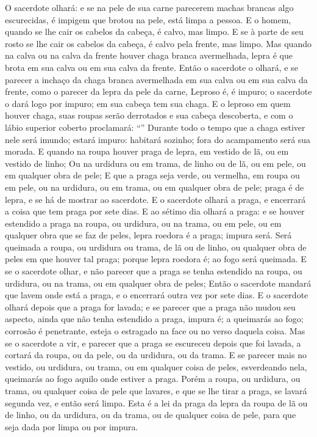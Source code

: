 {{  O sacerdote olhará: e se na pele de sua carne parecerem machas brancas algo escurecidas, é impigem que brotou na pele, está limpa a pessoa.
  E o homem, quando se lhe cair os cabelos da cabeça, é calvo, mas limpo.
  E se à parte de seu rosto se lhe cair os cabelos da cabeça, é calvo pela frente, mas limpo.
  Mas quando na calva ou na calva da frente houver chaga branca avermelhada, lepra é que brota em sua calva ou em sua calva da frente.
  Então o sacerdote o olhará, e se parecer a inchaço da chaga branca avermelhada em sua calva ou em sua calva da frente, como o parecer da lepra da pele da carne,
  Leproso é, é impuro; o sacerdote o dará logo por impuro; em sua cabeça tem sua chaga.
  E o leproso em quem houver chaga, suas roupas serão derrotados e sua cabeça descoberta, e com o lábio superior coberto proclamará: \enquote{}
  Durante todo o tempo que a chaga estiver nele será imundo; estará impuro: habitará sozinho; fora do acampamento será sua morada.
  E quando na roupa houver praga de lepra, em vestido de lã, ou em vestido de linho;
  Ou na urdidura ou em trama, de linho ou de lã, ou em pele, ou em qualquer obra de pele;
  E que a praga seja verde, ou vermelha, em roupa ou em pele, ou na urdidura, ou em trama, ou em qualquer obra de pele; praga é de lepra, e se há de mostrar ao sacerdote.
  E o sacerdote olhará a praga, e encerrará a coisa que tem praga por sete dias.
  E ao sétimo dia olhará a praga: e se houver estendido a praga na roupa, ou urdidura, ou na trama, ou em pele, ou em qualquer obra que se faz de peles, lepra roedora é a praga; impura será.
  Será queimada a roupa, ou urdidura ou trama, de lã ou de linho, ou qualquer obra de peles em que houver tal praga; porque lepra roedora é; ao fogo será queimada.
  E se o sacerdote olhar, e não parecer que a praga se tenha estendido na roupa, ou urdidura, ou na trama, ou em qualquer obra de peles;
  Então o sacerdote mandará que lavem onde está a praga, e o encerrará outra vez por sete dias.
  E o sacerdote olhará depois que a praga for lavada; e se parecer que a praga não mudou seu aspecto, ainda que não tenha estendido a praga, impura é; a queimarás ao fogo; corrosão é penetrante, esteja o estragado na face ou no verso daquela coisa.
  Mas se o sacerdote a vir, e parecer que a praga se escureceu depois que foi lavada, a cortará da roupa, ou da pele, ou da urdidura, ou da trama.
  E se parecer mais no vestido, ou urdidura, ou trama, ou em qualquer coisa de peles, esverdeando nela, queimarás ao fogo aquilo onde estiver a praga.
  Porém a roupa, ou urdidura, ou trama, ou qualquer coisa de pele que lavares, e que se lhe tirar a praga, se lavará segunda vez, e então será limpa.
  Esta é a lei da praga da lepra da roupa de lã ou de linho, ou da urdidura, ou da trama, ou de qualquer coisa de pele, para que seja dada por limpa ou por impura}.
\par }

